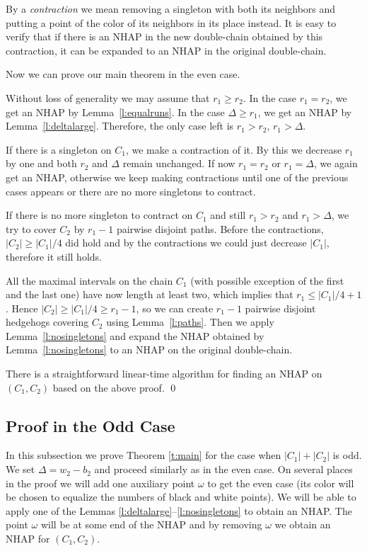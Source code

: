 \documentclass[12pt]{article}
\begin{document}
\bigskip

By a {\em contraction\/} we mean removing a singleton with both its
neighbors and putting a point of the color of its neighbors in its place
instead. It is easy to verify that if there is an NHAP in the new
double-chain obtained by this contraction, it can be expanded to an NHAP
in the original double-chain.

Now we can prove our main theorem in the even case.

\bigskip

\begin{pfoftmain}
Without loss of generality we may assume that $r_1 \geq r_2$. In the case
$r_1=r_2$, we get an NHAP by Lemma~\ref{l:equalruns}. In the case
$\Delta\ge r_1$, we get an NHAP by Lemma~\ref{l:deltalarge}. Therefore,
the only case left is $r_1>r_2$, $r_1>\Delta$.

If there is a singleton on $C_1$, we make a contraction of it. By this we
decrease $r_1$ by one and both $r_2$ and $\Delta$ remain unchanged. If
now $r_1=r_2$ or $r_1=\Delta$, we again get an NHAP, otherwise
we keep making contractions until one of the previous cases appears or there
are no more singletons to contract.

If there is no more singleton to contract on $C_1$ and still $r_1>r_2$ and
$r_1>\Delta$, we try to cover $C_2$ by $r_1-1$ pairwise disjoint paths.
Before the contractions, $|C_2| \geq |C_1|/4$ did hold and by the
contractions we could just decrease $|C_1|$, therefore it still holds.

All the maximal intervals on the chain $C_1$ (with possible exception of the
first and the last one) have now length at least two, which implies that
$r_1 \leq |C_1|/4 +1$.
Hence $|C_2| \geq |C_1|/4 \geq r_1 -1$, so we can create $r_1-1$
pairwise disjoint hedgehogs covering $C_2$ using Lemma~\ref{l:paths}.
Then we apply Lemma~\ref{l:nosingletons} and expand the NHAP obtained
by Lemma~\ref{l:nosingletons} to an NHAP on the original double-chain.

There is a straightforward linear-time algorithm for finding an NHAP
on $(C_1,C_2)$ based on the above proof.
\qed
\end{pfoftmain}




\subsection{Proof in the Odd Case}\label{s:odd}
In this subsection we prove Theorem \ref{t:main} for the case when $|C_1|+|C_2|$
is odd. We set $\Delta=w_2-b_2$ and proceed similarly as in the even case.
On several places in the proof we will add one auxiliary point
$\omega$ to get the even case (its color will be chosen to equalize
the numbers of black and white points). We will be able to apply one of the
Lemmas \ref{l:deltalarge}--\ref{l:nosingletons} to obtain an NHAP.
The point $\omega$ will be at some end of the NHAP and by removing
$\omega$ we obtain an NHAP for $(C_1, C_2)$.
\end{document}

